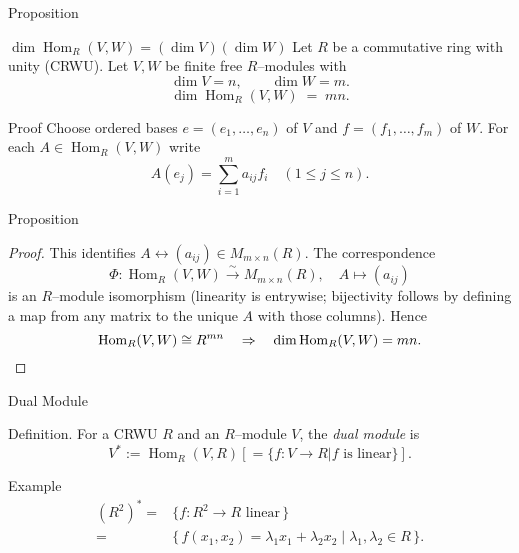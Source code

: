 
\date{22 October 2025}



\begin{frame}
  \cmctitleframe
\end{frame}

\begin{frame}{Proposition}
\vspace{-0.3cm}
\begin{block}{$\dim \operatorname{Hom}_R(V,W) = (\dim V)(\dim W)$}
Let $R$ be a commutative ring with unity (CRWU). Let $V,W$ be finite free $R$–modules with
\[
\dim V = n,\qquad \dim W = m.
\]
\[
\dim \operatorname{Hom}_R(V,W) \;=\; mn.
\]
\end{block}
\vspace{-0.3cm}
\begin{block}{Proof}
Choose ordered bases $e=(e_1,\dots,e_n)$ of $V$ and $f=(f_1,\dots,f_m)$ of $W$. For each $A\in \operatorname{Hom}_R(V,W)$ write
\[
A(e_j)=\sum_{i=1}^m a_{ij} f_i \quad (1\le j\le n).
\]
\end{block}

\end{frame}

\begin{frame}{Proposition}

\begin{proof}

This identifies $A \longleftrightarrow (a_{ij}) \in M_{m\times n}(R)$. The correspondence
\[
\Phi:\operatorname{Hom}_R(V,W) \xrightarrow{\;\sim\;} M_{m\times n}(R),\quad A\mapsto (a_{ij})
\]
is an $R$–module isomorphism (linearity is entrywise; bijectivity follows by defining a map from any matrix to the unique $A$ with those columns). Hence
\[
\operatorname{Hom}_R(V,W)\cong R^{mn}\quad\Rightarrow\quad \dim \operatorname{Hom}_R(V,W)=mn.\qedhere
\]
\end{proof}
\end{frame}

\begin{frame}{Dual Module}
\begin{block}{Definition.} For a CRWU $R$ and an $R$–module $V$, the \emph{dual module} is
\[
V^* := \operatorname{Hom}_R(V,R) \left[= \{f: V\to R|f\text{ is linear}\}\right].
\]  
\end{block}
\begin{block}{Example}  
\begin{align*}
(R^2)^*=&\{f:R^2\to R\text{ linear}\,\}\\
=&\{\,f(x_1,x_2)=\lambda_1 x_1+\lambda_2 x_2\mid \lambda_1,\lambda_2\in R\,\}.    
\end{align*}
    
\end{block}
\end{frame}

